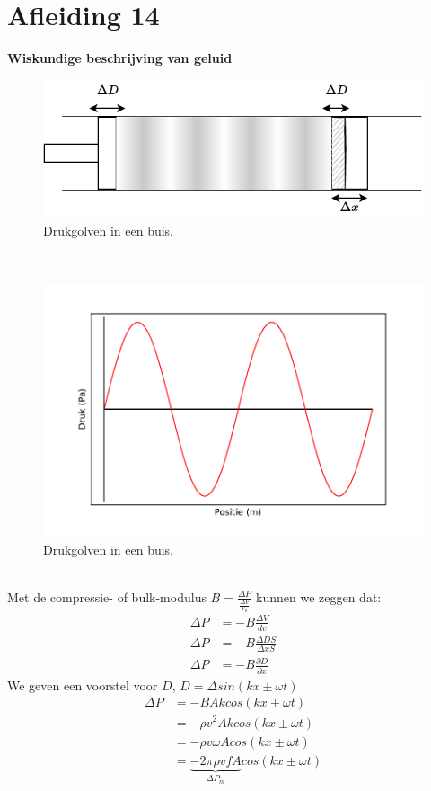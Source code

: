 \documentclass[a4paper,kul]{kulakarticle} %
\begin{document}
\section{Afleiding 14}
\textbf{Wiskundige beschrijving van geluid}\\
\begin{figure}[h]
	\centering
	\includegraphics[width=0.7\linewidth]{WiskundigeBeschrijving}
	\caption[Drukgolven]{Drukgolven in een buis.}
	\label{fig:drukgolvenbuis}
\end{figure}\\
\begin{figure}[h]
	\centering
	\includegraphics[width=0.5\linewidth]{Drukinbuis}
	\caption[Drukgolven]{Drukgolven in een buis.}
	\label{fig:drukgolvenbuisgrafiek}
\end{figure}\\

Met de compressie- of bulk-modulus $B = \frac{\Delta P}{\frac{\Delta V}{V_0}}$ kunnen we zeggen dat:
\begin{align*}
	\Delta P &= -B \frac{\Delta V}{dv}\\
	\Delta P &= -B \frac{\Delta DS}{\Delta xS}\\
	\Delta P &= -B \frac{\partial D}{\partial x}
\end{align*}
We geven een voorstel voor $D$, $D = \Delta sin(kx\pm \omega t)$
\begin{align*}
	\Delta P &= -BAkcos(kx\pm \omega t)\\
	&= -\rho v^2Akcos(kx\pm \omega t)\\
	&= -\rho v\omega Acos(kx\pm \omega t)\\
	&= \underbrace{-2\pi\rho vfA}_{\Delta P_m} cos(kx\pm \omega t)
\end{align*}
\newpage
\end{document}
